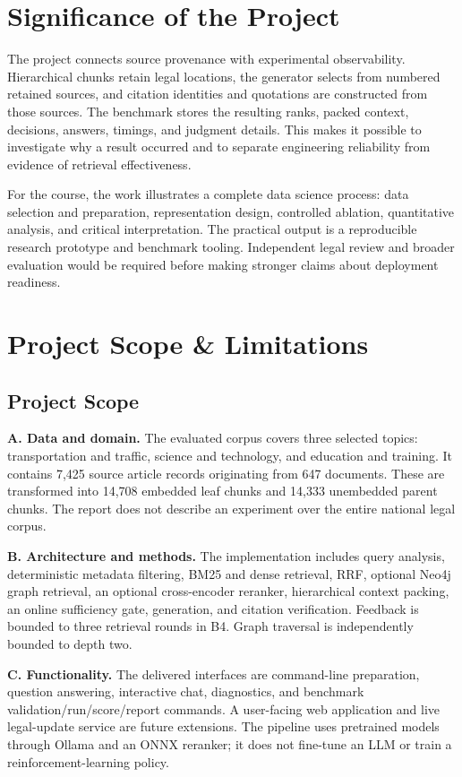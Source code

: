 \section{Significance of the Project}
The project connects source provenance with experimental observability. Hierarchical chunks retain legal locations, the generator selects from numbered retained sources, and citation identities and quotations are constructed from those sources. The benchmark stores the resulting ranks, packed context, decisions, answers, timings, and judgment details. This makes it possible to investigate why a result occurred and to separate engineering reliability from evidence of retrieval effectiveness.

For the course, the work illustrates a complete data science process: data selection and preparation, representation design, controlled ablation, quantitative analysis, and critical interpretation. The practical output is a reproducible research prototype and benchmark tooling. Independent legal review and broader evaluation would be required before making stronger claims about deployment readiness.

\section{Project Scope \& Limitations}
\subsection{Project Scope}
\textbf{A. Data and domain.} The evaluated corpus covers three selected topics: transportation and traffic, science and technology, and education and training. It contains 7,425 source article records originating from 647 documents. These are transformed into 14,708 embedded leaf chunks and 14,333 unembedded parent chunks. The report does not describe an experiment over the entire national legal corpus.

\textbf{B. Architecture and methods.} The implementation includes query analysis, deterministic metadata filtering, BM25 and dense retrieval, RRF, optional Neo4j graph retrieval, an optional cross-encoder reranker, hierarchical context packing, an online sufficiency gate, generation, and citation verification. Feedback is bounded to three retrieval rounds in B4. Graph traversal is independently bounded to depth two.

\textbf{C. Functionality.} The delivered interfaces are command-line preparation, question answering, interactive chat, diagnostics, and benchmark validation/run/score/report commands. A user-facing web application and live legal-update service are future extensions. The pipeline uses pretrained models through Ollama and an ONNX reranker; it does not fine-tune an LLM or train a reinforcement-learning policy.

